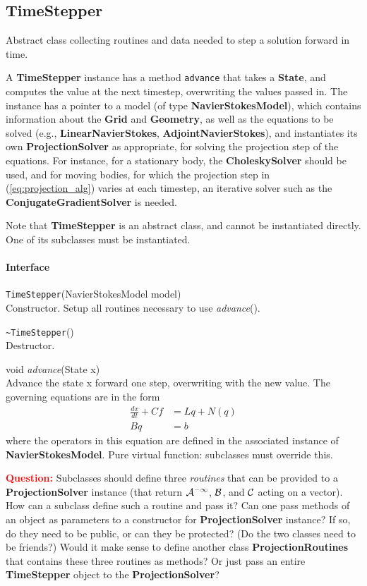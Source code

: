 \documentclass[11pt]{article}
\def\question#1{\textcolor{red}{\bf Question:} #1}
\def\class#1{{\bf #1}} %
\def\fn#1{{\tt #1}} %
\def\virtualfn#1{{\it #1}} %
\begin{document}
\subsection{TimeStepper}
Abstract class collecting routines and data needed to step a solution forward in time.

A \class{TimeStepper} instance has a method \fn{advance} that takes a \class{State}, and computes the value at the next timestep, overwriting the values passed in.  The instance has a pointer to a model (of type \class{NavierStokesModel}), which contains information about the \class{Grid} and \class{Geometry}, as well as the equations to be solved (e.g., \class{LinearNavierStokes}, \class{AdjointNavierStokes}), and instantiates its own \class{ProjectionSolver} as appropriate, for solving the projection step of the equations.  For instance, for a stationary body, the \class{CholeskySolver} should be used, and for moving bodies, for which the projection step in (\ref{eq:projection_alg}) varies at each timestep, an iterative solver such as the \class{ConjugateGradientSolver} is needed.

Note that \class{TimeStepper} is an abstract class, and cannot be instantiated directly.  One of its subclasses must be instantiated.

\paragraph{Interface}
\begin{description}
	\item \fn{TimeStepper}(NavierStokesModel model)\\
		Constructor.  Setup all routines necessary to use \virtualfn{advance}().
	\item \fn{\~\null TimeStepper}()\\
		Destructor.
	\item void \virtualfn{advance}(State x)\\
	 	Advance the state x forward one step, overwriting with the new value.  The governing equations are in the form
	\begin{align}
		\frac{dx}{dt} + Cf &= Lq + N(q)\\
		Bq &= b
	\end{align}
	where the operators in this equation are defined in the associated instance of \class{NavierStokesModel}.  Pure virtual function: subclasses must override this.
\end{description}

\question{Subclasses should define three {\em routines} that can be provided to a \class{ProjectionSolver} instance (that return $\cal{A}^{-1}$, $\cal{B}$, and $\cal{C}$ acting on a vector).  How can a subclass define such a routine and pass it?  Can one pass methods of an object as parameters to a constructor for \class{ProjectionSolver} instance?  If so, do they need to be public, or can they be protected? (Do the two classes need to be friends?)  Would it make sense to define another class \class{ProjectionRoutines} that contains these three routines as methods?  Or just pass an entire \class{TimeStepper} object to the \class{ProjectionSolver}?}
\end{document}
